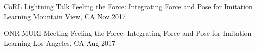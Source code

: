 \begin{cventries}
\cventry
{CoRL Lightning Talk} %
{Feeling the Force: Integrating Force and Pose for Imitation Learning} %
{Mountain View, CA} %
{Nov 2017} %
{ %
}
\vspace{-4mm}


\cventry
{ONR MURI Meeting} %
{Feeling the Force: Integrating Force and Pose for Imitation Learning} %
{Los Angeles, CA} %
{Aug 2017} %
{ %
}
\vspace{-10mm}


\end{cventries}